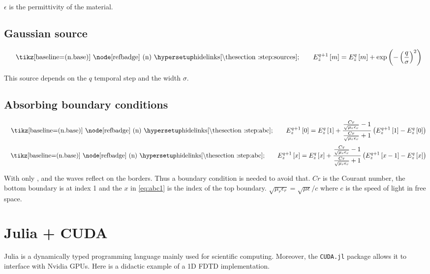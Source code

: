 \documentclass[../main.tex]{subfiles}
\begin{document}
$\epsilon$ is the permittivity of the material.

\subsection{Gaussian source}

\begin{equation}
	\text{\blackcircleref{step:sources}\quad}
	E_z^{q+1}\left[m\right] = E_z^{q}\left[m\right] + \exp\left(-\left(\frac{q}{\sigma}\right)^2\right)
\end{equation}

This source depends on the $q$ temporal step and the width $\sigma$.

\subsection{Absorbing boundary conditions}

\begin{equation}
	\text{\blackcircleref{step:abc}\quad}
	E_z^{q+1}\left[0\right] = E_z^{q}\left[1\right] + \frac{\frac{Cr}{\sqrt{\mu_r\epsilon_r}}-1}{\frac{Cr}{\sqrt{\mu_r\epsilon_r}}+1}\left(E_z^{q+1}\left[1\right]-E_z^q\left[0\right]\right)
\end{equation}
\begin{equation} \label{eq:abc1}
	\text{\blackcircleref{step:abc}\quad}
	E_z^{q+1}\left[x\right] = E_z^{q}\left[x\right] + \frac{\frac{Cr}{\sqrt{\mu_r\epsilon_r}}-1}{\frac{Cr}{\sqrt{\mu_r\epsilon_r}}+1}\left(E_z^{q+1}\left[x-1\right]-E_z^q\left[x\right]\right)
\end{equation}

With only ,  and  the waves reflect on the borders. Thus a boundary condition is needed to avoid that.
$Cr$ is the Courant number, the bottom boundary is at index 1 and the $x$ in \ref{eq:abc1} is the index of the top boundary.
$\sqrt{\mu_r\epsilon_r} = \sqrt{\mu\epsilon}/c$ where $c$ is the speed of light in free space.

\section{Julia + CUDA}
Julia\cite{juliaspec} is a dynamically typed programming language mainly used for scientific computing.
Moreover, the \texttt{CUDA.jl}\cite{besard2018juliagpu} package allows it to interface with Nvidia GPUs.
Here is a didactic example of a 1D FDTD implementation.
\inputminted[bgcolor=codeBg, tabsize=4, breaklines=true, linenos=true]{julia}{\subfix{add.jl}}
\end{document}
